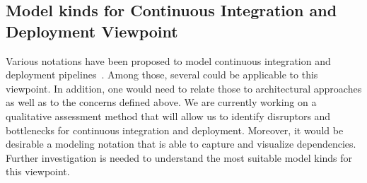 %
%



\subsection{Model kinds for Continuous Integration and Deployment Viewpoint}\label{mk:list}



Various notations have been proposed to model continuous integration and deployment pipelines~\cite{SB2014}. %
Among those, several could be applicable to this viewpoint.
In addition, one would need to relate those to architectural approaches as well as to the concerns defined above. 
We are currently working on a qualitative assessment method that will allow us to identify disruptors and bottlenecks for continuous integration and deployment.
Moreover, it would be desirable a modeling notation that is able to capture and visualize dependencies.  Further investigation is needed to understand the most suitable model kinds for this viewpoint.


